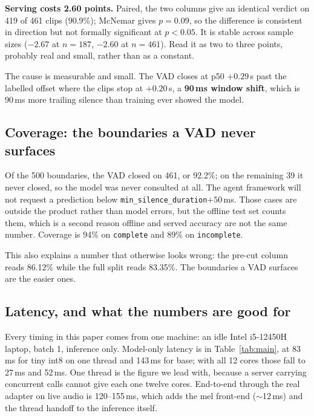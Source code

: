 \documentclass[11pt]{article}
\newcommand{\pct}{\%}
\begin{document}
\textbf{Serving costs 2.60 points.} Paired, the two columns give an identical
verdict on 419 of 461 clips (90.9\pct); McNemar \cite{mcnemar} gives $p=0.09$,
so the difference is consistent in direction but not formally significant at
$p<0.05$. It is stable across sample sizes ($-2.67$ at $n=187$, $-2.60$ at
$n=461$). Read it as two to three points, probably real and small, rather than
as a constant.

The cause is measurable and small. The VAD closes at p50 $+0.29$\,s past the
labelled offset where the clips stop at $+0.20$\,s, a \textbf{90\,ms window
shift}, which is 90\,ms more trailing silence than training ever showed the
model.

\subsection{Coverage: the boundaries a VAD never surfaces}

Of the 500 boundaries, the VAD closed on 461, or 92.2\pct{}; on the remaining 39
it never closed, so the model was never consulted at all. The agent framework
will not request a prediction below \texttt{min\_silence\_duration}$+50$\,ms.
Those cases are outside the product rather than model errors, but the offline
test set counts them, which is a second reason offline and served accuracy are
not the same number. Coverage is 94\pct{} on \texttt{complete} and 89\pct{} on
\texttt{incomplete}.

This also explains a number that otherwise looks wrong: the pre-cut column
reads 86.12\pct{} while the full split reads 83.35\pct{}. The boundaries a VAD
surfaces are the easier ones.

\subsection{Latency, and what the numbers are good for}
\label{sec:latency}

Every timing in this paper comes from one machine: an idle Intel i5-12450H
laptop, batch 1, inference only. Model-only latency is in Table~\ref{tab:main},
at 83\,ms for tiny int8 on one thread and 143\,ms for base; with all 12 cores
those fall to 27\,ms and 52\,ms. One thread is the figure we lead with, because
a server carrying concurrent calls cannot give each one twelve cores.
End-to-end through the real adapter on live audio is 120--155\,ms, which adds
the mel front-end ($\sim$12\,ms) and the thread handoff to the inference itself.
\end{document}
